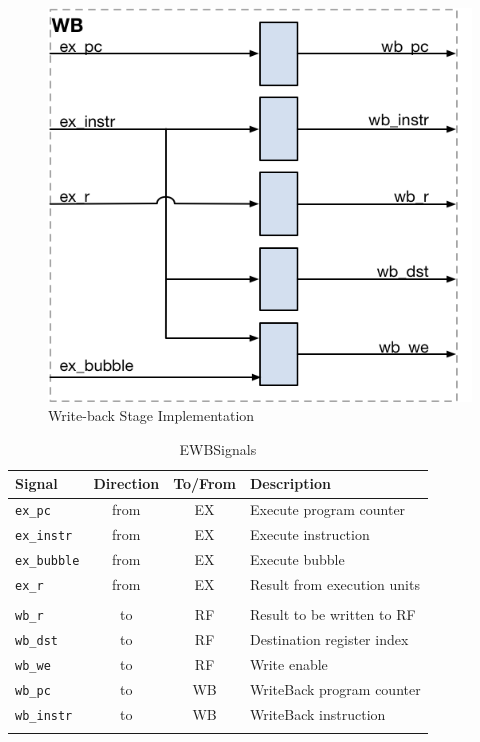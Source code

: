 \begin{figure}[h]
  \includegraphics{assets/img/Pipeline-WB}
  \caption{Write-back Stage Implementation}
\end{figure}

\begin{longtable}[]{@{}lccl@{}}
	\toprule
	\textbf{Signal} & \textbf{Direction} & \textbf{To/From} & \textbf{Description}\tabularnewline
	\midrule
	\endhead
		\texttt{ex\_pc}     & from & EX & Execute program counter\\
		\texttt{ex\_instr}  & from & EX & Execute instruction\\
		\texttt{ex\_bubble} & from & EX & Execute bubble\\
		\texttt{ex\_r}      & from & EX & Result from execution units\\
		                    &      &    & \\
		\texttt{wb\_r}      & to   & RF & Result to be written to RF\\
		\texttt{wb\_dst}    & to   & RF & Destination register index\\
		\texttt{wb\_we}     & to   & RF & Write enable\\
		\texttt{wb\_pc}     & to   & WB & WriteBack program counter\\
		\texttt{wb\_instr}  & to   & WB & WriteBack instruction\\

	\bottomrule
	\caption{EWBSignals}
	\label{tab:wb-signals}
\end{longtable}


